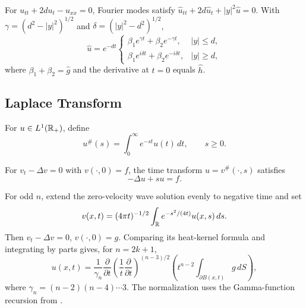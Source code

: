 \begin{example}
\label{ex:telegraph-equation-fourier-transform}

For $u_{tt}+2du_t-u_{xx}=0$, Fourier modes satisfy
$\hat u_{tt}+2d\hat u_t+|y|^2\hat u=0$. With
$\gamma=(d^2-|y|^2)^{1/2}$ and $\delta=(|y|^2-d^2)^{1/2}$,
\[
\hat u=e^{-dt}\begin{cases}
\beta_1e^{\gamma t}+\beta_2e^{-\gamma t},&|y|\le d,\\
\beta_1e^{i\delta t}+\beta_2e^{-i\delta t},&|y|\ge d,
\end{cases}
\]
where $\beta_1+\beta_2=\hat g$ and the derivative at $t=0$ equals $\hat h$.
\end{example}

\subsection{Laplace Transform}
\label{sec:laplace-transform}

\begin{definition}
\label{def:laplace-transform}
For $u\in L^1(\mathbb{R}_+)$, define
\[
u^\#(s)=\int_0^\infty e^{-st}u(t)\,dt,\qquad s\ge0.
\]
\end{definition}

\begin{example}
\label{ex:resolvent-laplace-transform}

For $v_t-\Delta v=0$ with $v(\cdot,0)=f$, the time transform
$u=v^\#(\cdot,s)$ satisfies
\[
-\Delta u+su=f.
\]
\end{example}

\begin{example}
\label{ex:wave-equation-from-heat-laplace-transform}

For odd $n$, extend the zero-velocity wave solution evenly to negative time and
set
\[
v(x,t)=(4\pi t)^{-1/2}\int_{\mathbb{R}} e^{-s^2/(4t)}u(x,s)\,ds.
\]
Then $v_t-\Delta v=0$, $v(\cdot,0)=g$. Comparing its heat-kernel formula and
integrating by parts gives, for $n=2k+1$,
\[
u(x,t)=\frac1{\gamma_n}\frac\partial{\partial t}
\left(\frac1t\frac\partial{\partial t}\right)^{(n-3)/2}
\left(t^{n-2}\int_{\partial B(x,t)}g\,dS\right),
\]
where $\gamma_n=(n-2)(n-4)\cdots3$.
The normalization uses the Gamma-function recursion from \cite{Rudin1976}.
\end{example}

